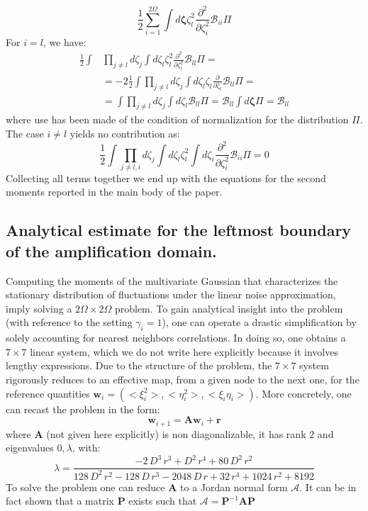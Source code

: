 \documentclass[showpacs,prl,superscriptaddress,nofootinbib, twocolumn]{revtex4}
\begin{document}
\[
\frac{1}{2} \sum_{i=1}^{2\Omega} \int d{\boldsymbol \zeta} \zeta_l^2 \frac{\partial^2}{\partial\zeta_i^2}{\mathcal B}_{ii}\Pi
\]  
For $i=l$, we have:
\[
\begin{split}
\frac{1}{2} \int &\prod_{j \neq l} d\zeta_j \int d\zeta_l \zeta_l^2 \frac{\partial^2}{\partial\zeta_l^2}{\mathcal B}_{ll}\Pi =\\
&=-2\frac{1}{2}\int \prod_{j \neq l} d\zeta_j \int d\zeta_l \zeta_l \frac{\partial}{\partial\zeta_l}{\mathcal B}_{ll}\Pi= \\
&=\int \prod_{j \neq l} d\zeta_j \int d\zeta_l {\mathcal B}_{ll}\Pi={\mathcal B}_{ll}\int d{\boldsymbol \zeta}\Pi={\mathcal B}_{ll}
\end{split}
\]
where use has been made of the condition of normalization for the distribution $\Pi$. The case $i\neq l$ yields no contribution as:
\[
\frac{1}{2} \int \prod_{j \neq l,i} d\zeta_j \int d\zeta_l \zeta_l^2 \int d\zeta_i \frac{\partial^2}{\partial\zeta_i^2}{\mathcal B}_{ii}\Pi=0
\]
Collecting all terms together we end up with the equations for the second moments reported in the main body of the paper.

\subsection{Analytical estimate for the leftmost boundary of the amplification domain.}

Computing the moments of the multivariate Gaussian that characterizes the stationary distribution of fluctuations under the linear noise approximation, imply solving a $2 \Omega  \times 2 \Omega$ problem. To gain analytical insight into the problem (with reference to the setting $\gamma_i=1$), one can operate a drastic simplification by solely accounting for nearest neighbors correlations. In doing so, one obtains a $7 \times 7$ linear system, which we do not write here explicitly because it involves lengthy expressions. Due to the structure of the problem, the $7 \times 7$ system rigorously  reduces to an effective map, from a given node to the next one, for the reference quantities ${\boldsymbol w}_i = (<\xi_i^2>,<\eta_i^2>,<\xi_i \eta_i>)$. More concretely, one can recast the problem in the form:
\[
{\boldsymbol w}_{i+1}={\boldsymbol A} {\boldsymbol w}_i+{\boldsymbol r}
\]
where ${\boldsymbol A}$ (not given here explicitly) is non diagonalizable, it has rank $2$ and eigenvalues $0,\lambda$, with:
\[
\lambda=\frac{ - 2\, D^3\, r^3 + D^2\, r^4 + 80\, D^2\, r^2}{128\, D^2\, r^2 - 128\, D\, r^3 - 2048\, D\, r + 32\, r^4 + 1024\, r^2 + 8192}
\]
To solve the problem one can reduce ${\boldsymbol A}$ to a Jordan normal form ${\boldsymbol {\mathcal A}}$. It can be in fact shown that a matrix ${\boldsymbol {P}}$ exists such that ${\boldsymbol {\mathcal A}}={\boldsymbol {P}}^{-1}{\boldsymbol {A}}{\boldsymbol {P}}$ 
\end{document}
